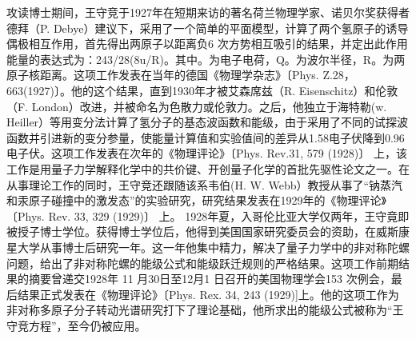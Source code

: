 攻读博士期间，王守竞于1927年在短期来访的著名荷兰物理学家、诺贝尔奖获得者德拜（P. Debye）建议下，采用了一个简单的平面模型，计算了两个氢原子的诱导偶极相互作用，首先得出两原子以距离负6 次方势相互吸引的结果，并定出此作用能量的表达式为：243/28(8u/R)。其中。为电子电荷，Q。为波尔半径，R。为两原子核距离。这项工作发表在当年的德国《物理学杂志》〔Phys. Z.28，663(1927)〕。他的这个结果，直到1930年才被艾森席兹（R. Eisenschitz）和伦敦（F. London）改进，并被命名为色散力或伦敦力。之后，他独立于海特勒(w. Heiller）等用变分法计算了氢分子的基态波函数和能级，由于采用了不同的试探波函数并引进新的变分参量，使能量计算值和实验值间的差异从1.58电子伏降到0.96电子伏。这项工作发表在次年的《物理评论》〔Phys. Rev.31, 579 (1928)〕 上，该工作是用量子力学解释化学中的共价键、开创量子化学的首批先驱性论文之一。在从事理论工作的同时，王守竞还跟随该系韦伯(H. W. Webb）教授从事了“钠蒸汽和汞原子碰撞中的激发态”的实验研究，研究结果发表在1929年的《物理评论》〔Phys. Rev. 33, 329 (1929)〕 上。
1928年夏，入哥伦比亚大学仅两年，王守竟即被授子博士学位。获得博士学位后，他得到美国国家研究委员会的资助，在威斯康星大学从事博士后研究一年。这一年他集中精力，解决了量子力学中的非对称陀螺问题，给出了非对称陀螺的能级公式和能级跃迁规则的严格结果。这项工作前期结果的摘要曾递交1928年 11 月30日至12月1 日召开的美国物理学会153 次例会，最后结果正式发表在《物理评论》〔Phys. Rex. 34, 243 (1929)]上。他的这项工作为非对称多原子分子转动光谱研究打下了理论基础，他所求出的能级公式被称为“王守竞方程”，至今仍被应用。

